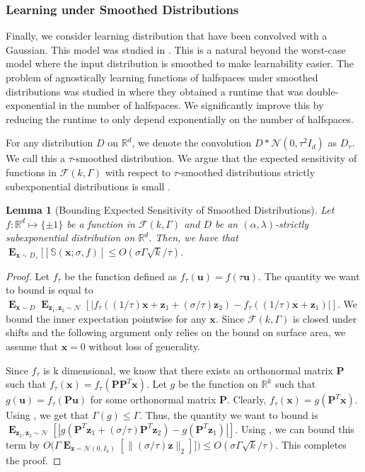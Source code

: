 \documentclass[10pt,a4paper]{article}
\newtheorem{lemma}{Lemma}[section]
\newcommand\twonorm[1]{\|#1\|_2}
\renewcommand\vec[1]{\mathbf{#1}}
\DeclareMathOperator*{\E}{\mathbf{E}}
\newcommand{\R}{\mathbb{R}}
\newcommand{\1}{\Ind}
\newcommand{\x}{\vec x}
\newcommand{\vu}{\vec u}
\newcommand{\z}{\vec z}
\newcommand{\F}{\mathcal{F}}
\newcommand{\Gauss}{\mathcal{N}}
\begin{document}
\subsubsection{Learning under Smoothed Distributions}
Finally, we consider learning distribution that have been convolved with a Gaussian. This model was studied in \cite{Kane2013LearningHalfspacesLogConcave}. This is a natural beyond the worst-case model where the input distribution is smoothed to make learnability easier. The problem of agnostically learning functions of halfspaces under smoothed distributions was studied in \cite{Kane2013LearningHalfspacesLogConcave} where they obtained a runtime that was double-exponential in the number of halfspaces. We significantly improve this by reducing the runtime to only depend exponentially on the number of halfspaces.

For any distribution $D$ on $\R^{d}$, we denote the convolution $D\ast \Gauss(0,\tau^2 I_d)$ as $D_{\tau}$. We call this a $\tau$-smoothed distribution. We argue that the expected sensitivity of functions in $\F(k,\Gamma)$ with respect to $\tau$-smoothed distributions strictly subexponential distributions is small .
\begin{lemma}[Bounding Expected Sensitivity of Smoothed Distributions]
\label{lem:sens_gaussian}
Let $f:\R^{d}\mapsto \{\pm 1\}$ be a function in $\F(k,\Gamma)$ and $D$ be an $(\alpha,\lambda)$-strictly subexponential distribution on $\R^{d}$.  Then, we have that $\E_{\x\sim D_{\tau}}[[\mathbb S(\x;\sigma, f)]\leq O(\sigma \Gamma\sqrt{k}/\tau)$.
\end{lemma}
\begin{proof}
Let $f_{\tau}$ be the function defined as $f_{\tau}(\vu)=f(\tau\vu)$.
The quantity we want to bound is equal to $\E_{\x\sim D}\E_{\z_1,\z_2\sim \Gauss}\left[|f_{\tau}((1/\tau)\x+\z_1+(\sigma/\tau)\z_2)-f_{\tau}((1/\tau)\x+\z_1)|\right]$. We bound the inner expectation pointwise for any $\x$. Since $\F(k,\Gamma)$ is closed under shifts and the following argument only relies on the bound on surface area, we assume that $\x=0$ without loss of generality. 

Since $f_{\tau}$ is k dimensional, we know that there exists an orthonormal matrix $\vec P$ such that $f_{\tau}(\x)=f_{\tau}(\vec P\vec P^T \x)$. Let $g$ be the function on $\R^k$ such that $g(\vu)=f_{\tau}(\vec P \vu)$ for some orthonormal matrix $\vec P$. Clearly, $f_{\tau}(\x)=g(\vec P^T \x)$.  Using , we get that $\Gamma(g)\leq \Gamma$.  Thus, the quantity we want to bound is $\E_{\z_1,\z_2\sim \Gauss}[ |g(\vec P^T\z_1+(\sigma/\tau)\vec P^T\z_2)-g(\vec P^T\z_1)|]$. Using , we can bound this term by $O\bigl(\Gamma \E_{\z \sim \Gauss(0,I_{k})}[\twonorm{(\sigma/\tau)\z}]]\bigr)\leq O(\sigma \Gamma\sqrt{k}/\tau)$. This completes the proof.
\end{proof}
\end{document}
